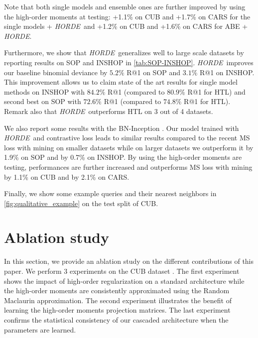\documentclass[10pt,twocolumn,letterpaper]{article}
\def\ourmethod{\textit{HORDE}}
\begin{document}
    Note that both single models and ensemble ones are further improved by using the high-order moments at testing: +1.1\% on CUB and +1.7\% on CARS for the single models + \ourmethod \ and +1.2\% on CUB and +1.6\% on CARS for ABE + \ourmethod.
    
    Furthermore, we show that \ourmethod \ generalizes well to large scale datasets by reporting results on SOP and INSHOP in \autoref{tab:SOP-INSHOP}.
    \ourmethod\ improves our baseline binomial deviance by $5.2\%$ R@1 on SOP and $3.1\%$ R@1 on INSHOP.
    This improvement allows us to claim state of the art results for single model methods on INSHOP with $\mathbf{84.2}\%$ R@1 (compared to $80.9\%$ R@1 for HTL) and second best on SOP with $72.6\%$ R@1 (compared to $74.8\%$ R@1 for HTL).
    Remark also that \ourmethod \ outperforms HTL on 3 out of 4 datasets.
    
    We also report some results with the BN-Inception \cite{Ioffe_2015_ICML}.
    Our model trained with \ourmethod \ and contrastive loss leads to similar results compared to the recent MS loss with mining \cite{Wang_2019_CVPR} on smaller datasets while on larger datasets we outperform it by 1.9\% on SOP and by 0.7\% on INSHOP.
    By using the high-order moments are testing, performances are further increased and outperforms MS loss with mining by 1.1\% on CUB and by 2.1\% on CARS.
    
    Finally, we show some example queries and their nearest neighbors in \autoref{fig:qualitative_example} on the test split of CUB. 
\section{Ablation study}\label{sec:abation_studies}
    In this section, we provide an ablation study on the different contributions of this paper.
    We perform 3 experiments on the CUB dataset \cite{CUB_200_2011}.
    The first experiment shows the impact of high-order regularization on a standard architecture while the high-order moments are consistently approximated using the Random Maclaurin approximation.
    The second experiment illustrates the benefit of learning the high-order moments projection matrices.
    The last experiment confirms the statistical consistency of our cascaded architecture when the parameters are learned.
    
\end{document}
